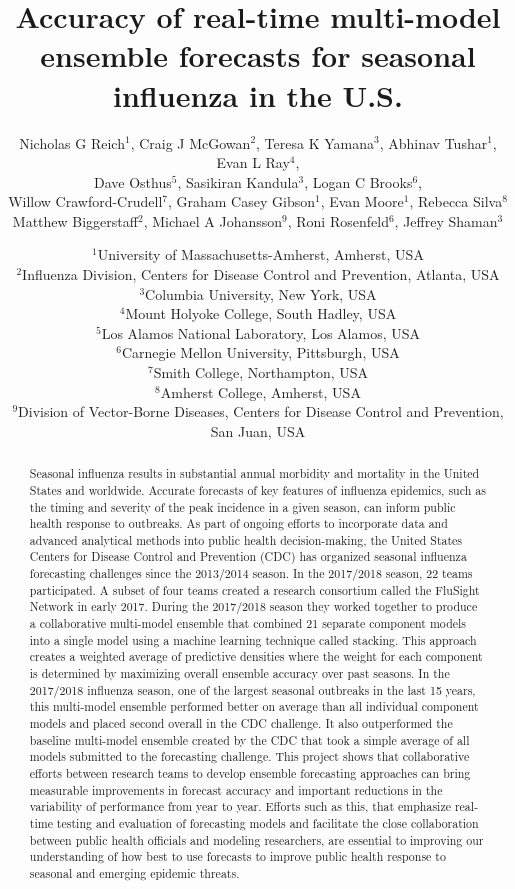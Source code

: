 \documentclass{article}\usepackage[]{graphicx}\usepackage[]{color}
\title{Accuracy of real-time multi-model ensemble forecasts for seasonal influenza in the U.S.}
\author{Nicholas G Reich$^1$, Craig J McGowan$^2$, Teresa K Yamana$^3$, Abhinav Tushar$^1$, Evan L Ray$^4$,\\
Dave Osthus$^5$, Sasikiran Kandula$^3$, Logan C Brooks$^6$,\\
Willow Crawford-Crudell$^7$, Graham Casey Gibson$^1$, Evan Moore$^1$, Rebecca Silva$^8$\\Matthew Biggerstaff$^2$, Michael A Johansson$^9$, Roni Rosenfeld$^6$, Jeffrey Shaman$^3$}
\date{%
    $^1$University of Massachusetts-Amherst, Amherst, USA\\%
    $^2$Influenza Division, Centers for Disease Control and Prevention, Atlanta, USA\\
    $^3$Columbia University, New York, USA\\
    $^4$Mount Holyoke College, South Hadley, USA\\
    $^5$Los Alamos National Laboratory, Los Alamos, USA\\
    $^6$Carnegie Mellon University, Pittsburgh, USA\\%
    $^7$Smith College, Northampton, USA\\
    $^8$Amherst College, Amherst, USA\\
    $^9$Division of Vector-Borne Diseases, Centers for Disease Control and Prevention, San Juan, USA\\
}
\begin{document}

\maketitle











\clearpage

\begin{abstract}
Seasonal influenza results in substantial annual morbidity and mortality in the United States and worldwide.
Accurate forecasts of key features of influenza epidemics, such as the timing and severity of the peak incidence in a given season, can inform public health response to outbreaks.
As part of ongoing efforts to incorporate data and advanced analytical methods into public health decision-making, the United States Centers for Disease Control and Prevention (CDC) has organized seasonal influenza forecasting challenges since the 2013/2014 season. 
In the 2017/2018 season, 22 teams participated. 
A subset of four teams created a research consortium called the FluSight Network in early 2017.
During the 2017/2018 season they worked together to produce a collaborative multi-model ensemble that combined 21 separate component models into a single model using a machine learning technique called stacking.
This approach creates a weighted average of predictive densities where the weight for each component is determined by maximizing overall ensemble accuracy over past seasons.
In the 2017/2018 influenza season, one of the largest seasonal outbreaks in the last 15 years, this multi-model ensemble performed better on average than all individual component models and placed second overall in the CDC challenge.
It also outperformed the baseline multi-model ensemble created by the CDC that took a simple average of all models submitted to the forecasting challenge.
This project shows that collaborative efforts between research teams to develop ensemble forecasting approaches can bring measurable improvements in forecast accuracy and important reductions in the variability of performance from year to year.
Efforts such as this, that emphasize real-time testing and evaluation of forecasting models and facilitate the close collaboration between public health officials and modeling researchers, are essential to improving our understanding of how best to use forecasts to improve public health response to seasonal and emerging epidemic threats.
\end{abstract}
\end{document}

